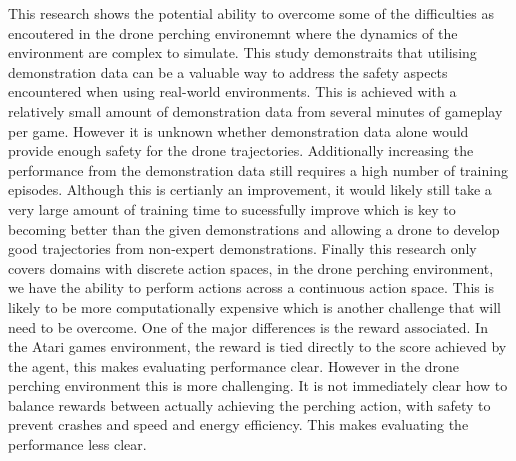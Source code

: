 This research shows the potential ability to overcome some of the difficulties as encoutered in the drone perching environemnt where the dynamics of the environment are complex to simulate.
This study demonstraits that utilising demonstration data can be a valuable way to address the safety aspects encountered when using real-world environments.
This is achieved with a relatively small amount of demonstration data from several minutes of gameplay per game.
However it is unknown whether demonstration data alone would provide enough safety for the drone trajectories.
Additionally increasing the performance from the demonstration data still requires a high number of training episodes.
Although this is certianly an improvement, it would likely still take a very large amount of training time to sucessfully improve which is key to becoming better than the given demonstrations and allowing a drone to develop good trajectories from non-expert demonstrations.
Finally this research only covers domains with discrete action spaces, in the drone perching environment, we have the ability to perform actions across a continuous action space.
This is likely to be more computationally expensive which is another challenge that will need to be overcome.
One of the major differences is the reward associated.
In the Atari games environment, the reward is tied directly to the score achieved by the agent, this makes evaluating performance clear.
However in the drone perching environment this is more challenging.
It is not immediately clear how to balance rewards between actually achieving the perching action, with safety to prevent crashes and speed and energy efficiency.
This makes evaluating the performance less clear.